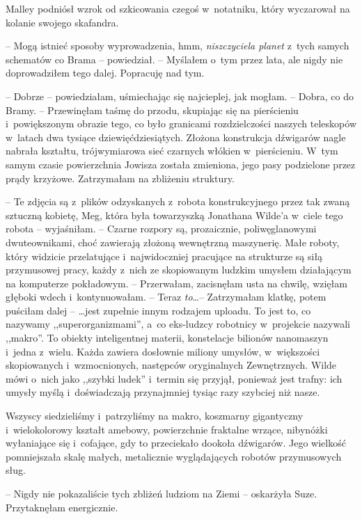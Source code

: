 \documentclass[oneside,polish,11pt,sfheadings]{mwbk}
\begin{document}
Malley podniósł wzrok od szkicowania czegoś w~notatniku, który
wyczarował na kolanie swojego skafandra. 

-- Mogą istnieć sposoby
wyprowadzenia, hmm, \textit{niszczyciela planet} z~tych samych schematów
co Brama -- powiedział. -- Myślałem o~tym przez lata, ale nigdy nie
doprowadziłem tego dalej. Popracuję nad tym.

-- Dobrze -- powiedziałam, uśmiechając się najcieplej, jak mogłam. -- Dobra, co do Bramy. -- Przewinęłam taśmę do przodu, skupiając się na
pierścieniu i~powiększonym obrazie tego, co było granicami
rozdzielczości naszych teleskopów w~latach dwa tysiące
dziewięćdziesiątych. Złożona konstrukcja dźwigarów nagle nabrała
kształtu, trójwymiarowa sieć czarnych włókien w~pierścieniu. W~tym samym
czasie powierzchnia Jowisza została zmieniona, jego pasy podzielone
przez prądy krzyżowe. Zatrzymałam na zbliżeniu struktury.

-- Te zdjęcia są z~plików odzyskanych z~robota konstrukcyjnego przez tak
zwaną sztuczną kobietę, Meg, która była towarzyszką Jonathana Wilde'a w~ciele tego robota -- wyjaśniłam. -- Czarne rozpory są, prozaicznie,
poliwęglanowymi dwuteownikami, choć zawierają złożoną wewnętrzną
maszynerię. Małe roboty, który widzicie przelatujące i~najwidoczniej
pracujące na strukturze są siłą przymusowej pracy, każdy z~nich ze
skopiowanym ludzkim umysłem działającym na komputerze pokładowym. -- Przerwałam, zacisnęłam usta na chwilę, wzięłam głęboki wdech i~kontynuowałam. -- Teraz \textit{to}\ldots  -- Zatrzymałam klatkę, potem puściłam
dalej -- \ldots  jest zupełnie innym rodzajem uploadu. To jest to, co
nazywamy ,,superorganizmami'', a~co eks-ludzcy robotnicy w~projekcie
nazywali ,,makro''. To obiekty inteligentnej materii, konstelacje
bilionów nanomaszyn i~jedna z~wielu. Każda zawiera dosłownie miliony
umysłów, w~większości skopiowanych i~wzmocnionych, następców
oryginalnych Zewnętrznych. Wilde mówi o~nich jako ,,szybki ludek'' i~termin się przyjął, ponieważ jest trafny: ich umysły myślą i~doświadczają przynajmniej tysiąc razy szybciej niż nasze.

Wszyscy siedzieliśmy i~patrzyliśmy na makro, koszmarny gigantyczny i~wielokolorowy kształt amebowy, powierzchnie fraktalne wrzące, nibynóżki
wyłaniające się i~cofające, gdy to przeciekało dookoła dźwigarów. Jego
wielkość pomniejszała skalę małych, metalicznie wyglądających robotów
przymusowych sług.

-- Nigdy nie pokazaliście tych zbliżeń ludziom na Ziemi -- oskarżyła Suze.
Przytaknęłam energicznie.
\end{document}
